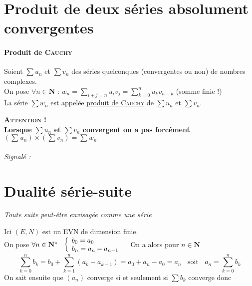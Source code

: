 \section{Produit de deux séries absolument convergentes}

		\vspace{-15pt}
		\traitd
		\paragraph{Produit de \textsc{Cauchy}}
			Soient $\sum u_n$ et $\sum v_n$ des séries quelconques (convergentes ou non) de nombres complexes.\\
			On pose $\forall n \in \mathbf{N}$ : $w_n = \sum\limits_{i+j=n} u_i v_j = \sum_{k=0}^{n} u_k v_{n-k}$ (somme finie !) \\
			La série $\sum w_n$ est appelée \underline{produit de \textsc{Cauchy}} de $\sum u_n$ et $\sum v_n$.
		\trait
				
		\textbf{\textsc{Attention !} \\Lorsque $\sum u_n$ et $\sum v_n$ convergent on a pas forcément 
			$\left(\sum u_n \right) \times \left(\sum v_n \right) = \sum w_n$} \medskip \\
		
		 \medskip \\

		\textit{\small Signalé :} \\


		\medskip

	\section{Dualité série-suite}
		
		\textit{Toute suite peut-être envisagée comme une série}
			
		Ici $(E,N)$ est un EVN de dimension finie.\\${}$ \\On pose $\forall n\in\mathbf{N}^* ~~ \left\{ \begin{array}{l}  b_0 = a_0 \\ b_n = a_n - a_{n-1} \end{array}
			\right.~~$ On a alors pour $n\in \mathbf{N}$ \\
			\[ \sum_{k=0}^{n} b_k = b_0 + \sum_{k=1}^{n} (a_k - a_{k-1} ) = a_0 +a_n - a_0 = a_n ~~~~\mathrm{soit} ~~~~ a_n = \sum_{k=0}^{n} b_k\]
			On sait ensuite que $(a_n)$ converge si et seulement si $\sum b_k$ converge donc 
			
		\begin{center}
		\end{center} \medskip
		

\fin